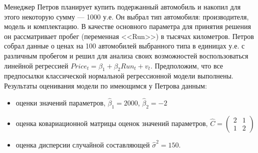 \documentclass[addpoints, answers]{exam} %
\begin{document}
\begin{questions}
\begin{parts}
\begin{solution}
\end{solution}

\end{parts}

\question Менеджер Петров планирует купить подержанный автомобиль и накопил для этого некоторую сумму --- 1000 у.е. Он выбрал тип автомобиля: производителя, модель и комплектацию. В качестве основного параметра для принятия решения он рассматривает пробег (переменная <<Run>>) в тысячах километров. Петров собрал данные о ценах на 100 автомобилей выбранного типа в единицах у.е. с различным пробегом и решил для анализа своих возможностей воспользоваться линейной регрессией $Price_t=\beta_1+\beta_2 Run_t+v_t$. Предположим, что все предпосылки классической нормальной регрессионной модели выполнены. Результаты оценивания модели по имеющимся у Петрова данным:
\begin{itemize}
\item оценки значений параметров, $\hat{\beta}_1=2000$, $\hat{\beta}_2=-2$
\item оценка ковариационной матрицы оценок значений параметров, $\hat{C}=
\begin{pmatrix}
2 & 1 \\
1 & 2
\end{pmatrix}$
\item оценка дисперсии случайной составляющей $\hat{\sigma}^2=150$.
\end{itemize}

\end{questions}
\end{document}
